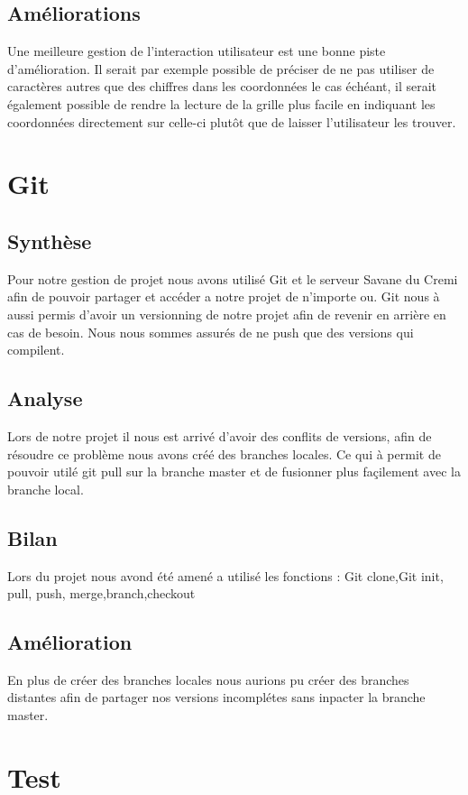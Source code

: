 \documentclass[12pt]{article}
\begin{document}
\subsection{Am\'eliorations}

Une meilleure gestion de l'interaction utilisateur est une bonne piste d'am\'elioration.
Il serait par exemple possible de pr\'eciser de ne pas utiliser de caract\`eres autres que
des chiffres dans les coordonn\'ees le cas \'ech\'eant, il serait \'egalement possible de rendre
la lecture de la grille plus facile en indiquant les coordonn\'ees directement sur celle-ci 
plutôt que de laisser l'utilisateur les trouver.



\section{Git}
\subsection{Synthèse}
Pour notre gestion de projet nous avons utilisé Git et le serveur Savane du Cremi afin de pouvoir partager et accéder a notre projet de n'importe ou.
Git nous à aussi permis d'avoir un versionning de notre projet afin de revenir en arrière en cas de besoin.
Nous nous sommes assurés de ne push que des versions qui compilent.
\subsection{Analyse}
Lors de notre projet il nous est arrivé d'avoir des conflits de versions, afin de résoudre ce problème nous avons créé des branches locales. 
Ce qui à permit de pouvoir utilé git pull sur la branche master et de fusionner plus façilement avec la branche local.
\subsection{Bilan}
Lors du projet nous avond été amené a utilisé les fonctions : Git clone,Git init, pull, push, merge,branch,checkout
\subsection{Amélioration}
En plus de créer des branches locales nous aurions pu créer des branches distantes afin de partager nos versions incomplétes sans inpacter la branche master.



\section{Test}
\end{document}
